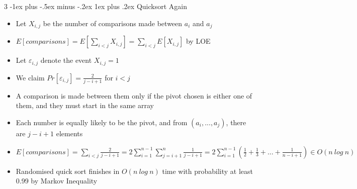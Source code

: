 \documentclass[10pt, landscape]{article}
\makeatletter
\renewcommand{\subsection}{\@startsection{subsection}{3}{0mm}%
                                {-1ex plus -.5ex minus -.2ex}%
                                {1ex plus .2ex}%
                                {\normalfont\small\bfseries}}%
\makeatother
\begin{document}
\begin{multicols*}{3}
\subsection{Quicksort Again}
\begin{itemize}
    \item Let $X_{i,j}$ be the number of comparisons made between $a_i$ and $a_j$
    \item $E[comparisons]=E[\sum_{i<j}X_{i,j}]=\sum_{i<j}E[X_{i,j}]$ by LOE
    \item Let $\varepsilon_{i,j}$ denote the event $X_{i,j}=1$
    \item We claim $Pr[\varepsilon_{i,j}] = \frac{2}{j-i+1}$ for $i<j$
    \item A comparison is made between them only if the pivot chosen is either one of them, and they must start in the same array
    \item Each number is equally likely to be the pivot, and from $(a_i,...,a_j)$, there are $j-i+1$ elements
    \item $E[comparisons]=\sum_{i<j}\frac{2}{j-i+1}=2\sum_{i=1}^{n-1}\sum_{j=i+1}^n\frac{1}{j-i+1}=2\sum_{i=1}^{n-1}(\frac{1}{2}+\frac{1}{3}+...+\frac{1}{n-i+1})\in O(n\ log\ n)$
    \item Randomised quick sort finishes in $O(n\ log\ n)$ time with probability at least 0.99 by Markov Inequality
\end{itemize}


\end{multicols*}
\end{document}
